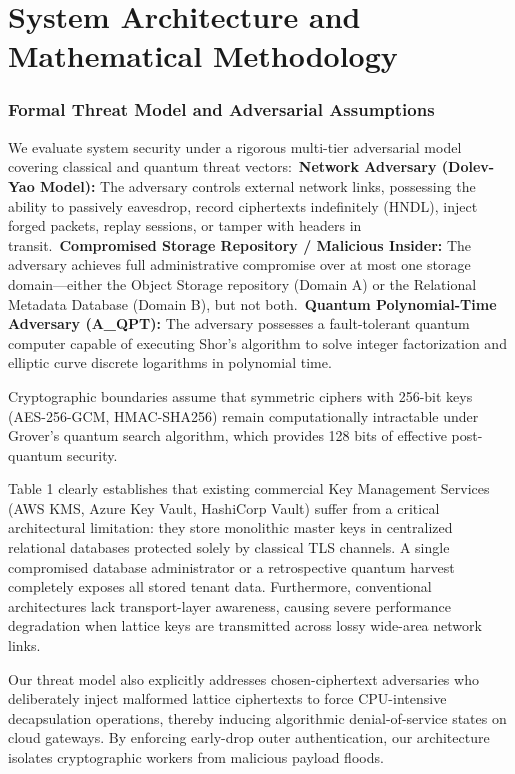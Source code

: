 \documentclass[5p,times]{elsarticle}
\begin{document}
\FloatBarrier
\section{System Architecture and Mathematical Methodology}


\subsubsection{Formal Threat Model and Adversarial Assumptions}

We evaluate system security under a rigorous multi-tier adversarial model covering classical and quantum threat vectors:\newline \textbullet\  \textbf{Network Adversary (Dolev-Yao Model):} The adversary controls external network links, possessing the ability to passively eavesdrop, record ciphertexts indefinitely (HNDL), inject forged packets, replay sessions, or tamper with headers in transit.\newline \textbullet\  \textbf{Compromised Storage Repository / Malicious Insider:} The adversary achieves full administrative compromise over at most one storage domain---either the Object Storage repository (Domain A) or the Relational Metadata Database (Domain B), but not both.\newline \textbullet\  \textbf{Quantum Polynomial-Time Adversary (A\_QPT):} The adversary possesses a fault-tolerant quantum computer capable of executing Shor's algorithm to solve integer factorization and elliptic curve discrete logarithms in polynomial time.

Cryptographic boundaries assume that symmetric ciphers with 256-bit keys (AES-256-GCM, HMAC-SHA256) remain computationally intractable under Grover's quantum search algorithm, which provides 128 bits of effective post-quantum security.

Table 1 clearly establishes that existing commercial Key Management Services (AWS KMS, Azure Key Vault, HashiCorp Vault) suffer from a critical architectural limitation: they store monolithic master keys in centralized relational databases protected solely by classical TLS channels. A single compromised database administrator or a retrospective quantum harvest completely exposes all stored tenant data. Furthermore, conventional architectures lack transport-layer awareness, causing severe performance degradation when lattice keys are transmitted across lossy wide-area network links.

Our threat model also explicitly addresses chosen-ciphertext adversaries who deliberately inject malformed lattice ciphertexts to force CPU-intensive decapsulation operations, thereby inducing algorithmic denial-of-service states on cloud gateways. By enforcing early-drop outer authentication, our architecture isolates cryptographic workers from malicious payload floods.
\end{document}
